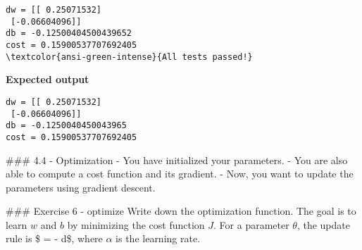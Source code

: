 \documentclass[11pt]{article}
\begin{document}
    \begin{Verbatim}[commandchars=\\\{\}]
dw = [[ 0.25071532]
 [-0.06604096]]
db = -0.12500404500439652
cost = 0.15900537707692405
\textcolor{ansi-green-intense}{All tests passed!}
    \end{Verbatim}

    \textbf{Expected output}

\begin{verbatim}
dw = [[ 0.25071532]
 [-0.06604096]]
db = -0.1250040450043965
cost = 0.15900537707692405
\end{verbatim}

    \#\#\# 4.4 - Optimization - You have initialized your parameters. - You
are also able to compute a cost function and its gradient. - Now, you
want to update the parameters using gradient descent.

\#\#\# Exercise 6 - optimize Write down the optimization function. The
goal is to learn \(w\) and \(b\) by minimizing the cost function \(J\).
For a parameter \(\theta\), the update rule is \$ \theta = \theta -
\alpha \text{ } d\theta\$, where \(\alpha\) is the learning rate.
\end{document}
